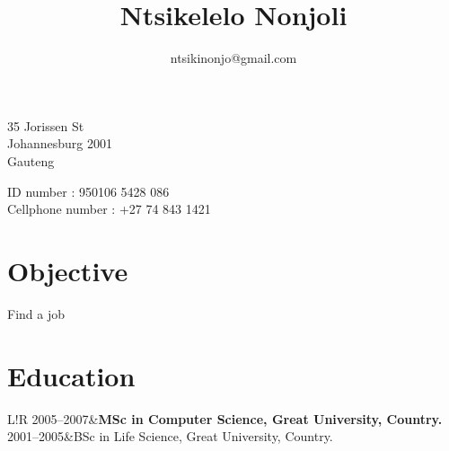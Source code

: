 \documentclass[12pt]{article}
\title{\bfseries\Huge Ntsikelelo Nonjoli}
\author{ntsikinonjo@gmail.com}
\date{}
\newcommand\VRule{\color{lightgray}\vrule width 0.5pt}
\begin{document}
	
\maketitle
\vspace{1em}
\begin{minipage}[ht]{0.48\textwidth}
	35 Jorissen St\\
	Johannesburg 2001\\
	Gauteng
\end{minipage}
\begin{minipage}[ht]{0.48\textwidth}
	\flushright
	ID number : 950106 5428 086\\
	Cellphone number : +27 74 843 1421
\end{minipage}
\vspace{20pt}

\section*{Objective}
Find a job

\section*{Education}
\begin{tabular}{L!{\VRule}R}
	2005--2007&{\bf MSc in Computer Science, Great University, Country.}\\[5pt]
	2001--2005&BSc in Life Science, Great University, Country.\\
\end{tabular}
	
\end{document}
